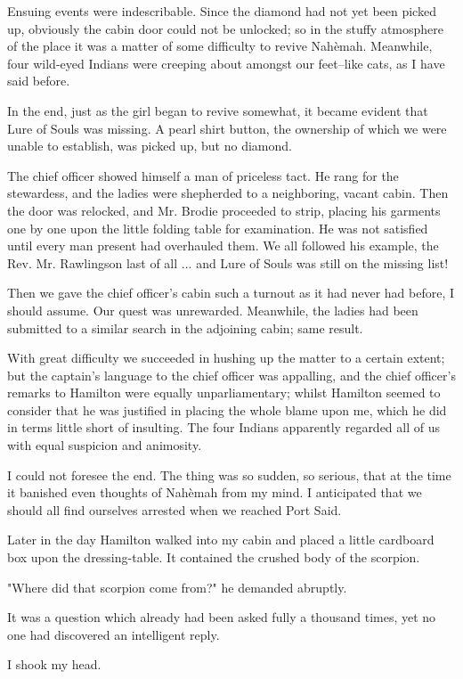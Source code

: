 Ensuing events were indescribable. Since the diamond had not yet been
picked up, obviously the cabin door could not be unlocked; so in the
stuffy atmosphere of the place it was a matter of some difficulty to
revive Nahèmah. Meanwhile, four wild-eyed Indians were creeping about
amongst our feet--like cats, as I have said before.

In the end, just as the girl began to revive somewhat, it became
evident that Lure of Souls was missing. A pearl shirt button, the
ownership of which we were unable to establish, was picked up, but no
diamond.

The chief officer showed himself a man of priceless tact. He rang for
the stewardess, and the ladies were shepherded to a neighboring,
vacant cabin. Then the door was relocked, and Mr. Brodie proceeded to
strip, placing his garments one by one upon the little folding table
for examination. He was not satisfied until every man present had
overhauled them. We all followed his example, the Rev. Mr. Rawlingson
last of all ... and Lure of Souls was still on the missing list!

Then we gave the chief officer's cabin such a turnout as it had never
had before, I should assume. Our quest was unrewarded. Meanwhile, the
ladies had been submitted to a similar search in the adjoining cabin;
same result.

With great difficulty we succeeded in hushing up the matter to a
certain extent; but the captain's language to the chief officer was
appalling, and the chief officer's remarks to Hamilton were equally
unparliamentary; whilst Hamilton seemed to consider that he was
justified in placing the whole blame upon me, which he did in terms
little short of insulting. The four Indians apparently regarded all
of us with equal suspicion and animosity.

I could not foresee the end. The thing was so sudden, so serious, that
at the time it banished even thoughts of Nahèmah from my mind. I
anticipated that we should all find ourselves arrested when we reached
Port Said.

Later in the day Hamilton walked into my cabin and placed a little
cardboard box upon the dressing-table. It contained the crushed body
of the scorpion.

"Where did that scorpion come from?" he demanded abruptly.

It was a question which already had been asked fully a thousand times,
yet no one had discovered an intelligent reply.

I shook my head.

